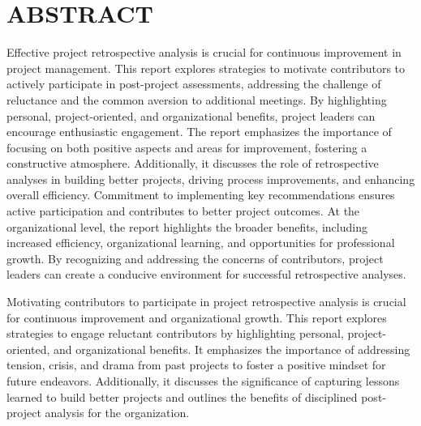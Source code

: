 \documentclass{article}
\begin{document}

\newpage
\tableofcontents
\newpage

\section{ABSTRACT}
    Effective project retrospective analysis is crucial for continuous improvement in project management. This report explores strategies to motivate contributors to actively participate in post-project assessments, addressing the challenge of reluctance and the common aversion to additional meetings. By highlighting personal, project-oriented, and organizational benefits, project leaders can encourage enthusiastic engagement. The report emphasizes the importance of focusing on both positive aspects and areas for improvement, fostering a constructive atmosphere. Additionally, it discusses the role of retrospective analyses in building better projects, driving process improvements, and enhancing overall efficiency. Commitment to implementing key recommendations ensures active participation and contributes to better project outcomes. At the organizational level, the report highlights the broader benefits, including increased efficiency, organizational learning, and opportunities for professional growth. By recognizing and addressing the concerns of contributors, project leaders can create a conducive environment for successful retrospective analyses.


    Motivating contributors to participate in project retrospective analysis is crucial for continuous improvement and organizational growth. This report explores strategies to engage reluctant contributors by highlighting personal, project-oriented, and organizational benefits. It emphasizes the importance of addressing tension, crisis, and drama from past projects to foster a positive mindset for future endeavors. Additionally, it discusses the significance of capturing lessons learned to build better projects and outlines the benefits of disciplined post-project analysis for the organization.

\newpage
\end{document}
